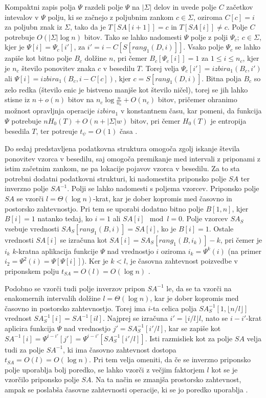 Kompaktni zapis polja $\Psi$ razdeli polje $\Psi$ na $|\Sigma|$ delov in uvede polje $C$ začetkov intevalov v $\Psi$ polju, ki se začnejo z poljubnim zankom $c\in\Sigma$, oziroma $C[c]=i$ za poljubn znak iz $\Sigma$, tako da je $T[SA[i+1]]=c$ in $T[SA[i]]\ne c$. Polje $C$ potrebuje $O(|\Sigma|\log{n})$ bitov. Tako se lahko nadomesti $\Psi$ polje z polji $\Psi_c;\:c\in\Sigma$, kjer je $\Psi[i]=\Psi_c[i']$,  za $i'=i-C[S[rang_1(D,i)]]$. Vsako polje $\Psi_c$ se lahko zapiše kot bitno polje $B_c$ dolžine $n$, pri čemer $B_c[\Psi_c[i]]=1$ za $1 \le i \le n_c$, kjer je $n_c$ število ponovitev znaka $c$ v besedilu $T$. Torej velja $\Psi_c[i']=izbira_1(B_c,i')$ ali $\Psi[i]=izbira_1(B_c,i-C[c])$, kjer $c=S[rang_1(D,i)]$. Bitna polja $B_c$ so zelo redka (število enic je bistveno manjše kot število ničel), torej se jih lahko stisne iz $n+o(n)$ bitov na $n_c\log\frac{n}{n_c}+O(n_c)$ bitov, pričemer ohranimo možnost opravljnja operacije $\textit{izbira}_1$ v konstantnem času, kar pomeni, da funkcija $\Psi$ potrebuje $nH_0(T)+O(n+|\Sigma|w)$ bitov, pri čemer $H_0(T)$ je entropija besedila $T$, ter potreuje $t_\psi=O(1)$ časa \cite{Navarro2016}.

Do sedaj predstavljena podatkovna struktura omogoča zgolj iskanje števila ponovitev vzorca v besedilu, saj omogoča premikanje med intervali z priponami z istim začetnim zankom, ne pa lokacije pojavov vzorca v besedilu. Za to sta potrebni dodatni podatkovni strukturi, ki nadomestita priponsko polje $SA$ ter inverzno polje $SA^{-1}$. Polji se lahko nadomesti s poljema vzorcev. Priponsko polje $SA$ se vzorči $l=\Theta(\log{n})$-krat, kar je dober kopromis med časovno in postorsko zahtevnostjo. Pri tem se uporabi dodatno bitno polje $B[1,n]$, kjer $B[i]=1$ natanko tedaj, ko $i=1$ ali $SA[i]\mod{l} =0$. Polje vzorcev $SA_S$ vsebuje vrednosti $SA_S[rang_1(B,i)]=SA[i]$, ko je $B[i]=1$. Ostale vrednosti $SA[i]$ se izračuna kot $SA[i]=SA_S[rang_1(B,i_k)]-k$, pri čemer je $i_k$ $k$-kratna aplikacija funkcije $\Psi$ nad vrednostjo $i$ oziroma $i_k=\Psi^k(i)$ (na primer $i_2=\Psi^2(i)=\Psi[\Psi[i]]$). Ker je $k< l$, je časovna zahtevnost poizvedbe v priponskem polju $t_{SA}=O(l)=O(\log{n})$ \cite{Navarro2016}.

Podobno se vzorči tudi polje inverzov pripon $SA^{-1}$ le, da se ta vzorči na enakomernih intervalih dolžine $l=\Theta(\log{n})$, kar je dober kopromis med časovno in postorsko zahtevnostjo. Torej ima $i$-ta celica polja $SA^{-1}_S[1,\lfloor n/l\rfloor]$ vrednost $SA^{-1}_S[i]=SA^{-1}[il]$. Najprej se izračuna $i'=\lfloor i/l\rfloor l$, nato se $i-i'$-krat aplicira funkcija $\Psi$ nad vrednostjo $j'=SA^{-1}_S[i'/l]$, kar se zapiše kot $SA^{-1}[i]=\Psi^{i-i'}[j']=\Psi^{i-i'}[SA^{-1}_S[i'/l]]$. Isti razmisliek kot za polje $SA$ velja tudi za polje $SA^{-1}$, ki ima časovno zahtevnost dostopa $t_{SA}=O(l)=O(\log{n})$. Pri tem velja omeniti, da če se inverzno priponsko polje uporablja bolj poredko, se lahko vzorči z večjim faktorjem $l$ kot se je vzorčilo priponsko polje $SA$. Na ta način se zmanjša prostorsko zahtevnost, ampak se poslabša časovne zahtevnosti operacije, ki se jo poredko uporablja \cite{Navarro2016}.

